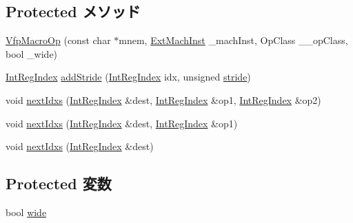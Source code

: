 \subsection*{Protected メソッド}
\begin{DoxyCompactItemize}
\item 
\hyperlink{classArmISA_1_1VfpMacroOp_ad1ea467a0c112f63d8149e20c8cc1389}{VfpMacroOp} (const char $\ast$mnem, \hyperlink{classStaticInst_a5605d4fc727eae9e595325c90c0ec108}{ExtMachInst} \_\-machInst, OpClass \_\-\_\-opClass, bool \_\-wide)
\item 
\hyperlink{namespaceArmISA_ae64680ba9fb526106829d6bf92fc791b}{IntRegIndex} \hyperlink{classArmISA_1_1VfpMacroOp_aad8d1dafc419f6554255546d0a4c11b9}{addStride} (\hyperlink{namespaceArmISA_ae64680ba9fb526106829d6bf92fc791b}{IntRegIndex} idx, unsigned \hyperlink{namespaceArmISA_a37eb53a9544702853d40d1e014ba88ea}{stride})
\item 
void \hyperlink{classArmISA_1_1VfpMacroOp_a9e705a53812c8caae187386eb8134f7d}{nextIdxs} (\hyperlink{namespaceArmISA_ae64680ba9fb526106829d6bf92fc791b}{IntRegIndex} \&dest, \hyperlink{namespaceArmISA_ae64680ba9fb526106829d6bf92fc791b}{IntRegIndex} \&op1, \hyperlink{namespaceArmISA_ae64680ba9fb526106829d6bf92fc791b}{IntRegIndex} \&op2)
\item 
void \hyperlink{classArmISA_1_1VfpMacroOp_a6dd00740691349223310ace731189cb8}{nextIdxs} (\hyperlink{namespaceArmISA_ae64680ba9fb526106829d6bf92fc791b}{IntRegIndex} \&dest, \hyperlink{namespaceArmISA_ae64680ba9fb526106829d6bf92fc791b}{IntRegIndex} \&op1)
\item 
void \hyperlink{classArmISA_1_1VfpMacroOp_afc9b9d5a5b0758715df8dbe62c44be5a}{nextIdxs} (\hyperlink{namespaceArmISA_ae64680ba9fb526106829d6bf92fc791b}{IntRegIndex} \&dest)
\end{DoxyCompactItemize}
\subsection*{Protected 変数}
\begin{DoxyCompactItemize}
\item 
bool \hyperlink{classArmISA_1_1VfpMacroOp_a86d61e2201f65de0e7dc7999569f3380}{wide}
\end{DoxyCompactItemize}


